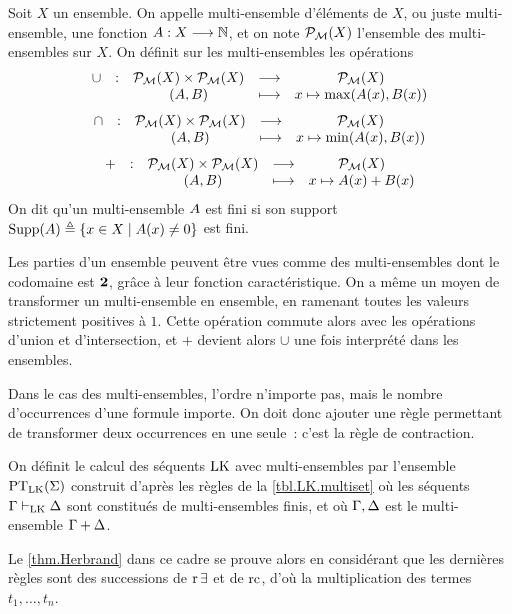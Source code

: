\begin{definition}
  Soit $X$ un ensemble.
  On appelle multi-ensemble d'éléments de $X$, ou juste multi-ensemble,
  une fonction $A : \displaystyle X \longrightarrow \mathbb N$, et on note $\mathcal{P}_{\mathcal{M}}(X)$
  l'ensemble des multi-ensembles sur $X$. On définit sur les
  multi-ensembles les opérations
  \[
  \makeFun{\cup}{\powermul(X)\times\powermul(X)}{\powermul(X)}
          {(\varPt,\varPtB)}{x \mapsto \max(\varPt(x),\varPtB(x))}
  \]
  \[
  \makeFun{\cap}{\powermul(X)\times\powermul(X)}{\powermul(X)}
          {(\varPt,\varPtB)}{x \mapsto \min(\varPt(x),\varPtB(x))}
  \]
  \[
  \makeFun{+}{\powermul(X)\times\powermul(X)}{\powermul(X)}
          {(\varPt,\varPtB)}{x \mapsto \varPt(x) + \varPtB(x)}
  \]
  On dit qu'un multi-ensemble $A$ est fini si son support
  $\operatorname{Supp}(A) \triangleq \left\{ x \in X \;\middle\vert\; A(x) \neq 0 \right\}$ est fini.
\end{definition}

\begin{remark}
  Les parties d'un ensemble peuvent être vues comme des multi-ensembles dont
  le codomaine est $\bm{2}$, grâce à leur fonction caractéristique. On a même
  un moyen de transformer un multi-ensemble en ensemble, en ramenant toutes les
  valeurs strictement positives à $1$. Cette opération commute alors avec les
  opérations d'union et d'intersection, et $+$ devient alors $\cup$ une fois
  interprété dans les ensembles.
\end{remark}

Dans le cas des multi-ensembles, l'ordre n'importe pas, mais le nombre
d'occurrences d'une formule importe. On doit donc ajouter une règle permettant
de transformer deux occurrences en une seule~: c'est la règle de contraction.

\begin{definition}
  On définit le calcul des séquents $\operatorname{LK}$ avec multi-ensembles par l'ensemble
  $\operatorname{PT}_{\operatorname{LK}}(\Sigma)$ construit d'après les règles de la \cref{tbl.LK.multiset} où
  les séquents $\Gamma\vdash_{\operatorname{LK}}\Delta$ sont constitués de multi-ensembles finis, et
  où $\Gamma,\Delta$ est le multi-ensemble $\Gamma + \Delta$.
\end{definition}

Le \cref{thm.Herbrand} dans ce cadre se prouve alors en considérant que les
dernières règles sont des successions de $\operatorname{r}\mathord{\exists}$ et de $\operatorname{rc}$, d'où la
multiplication des termes $t_1,\ldots,t_n$.

